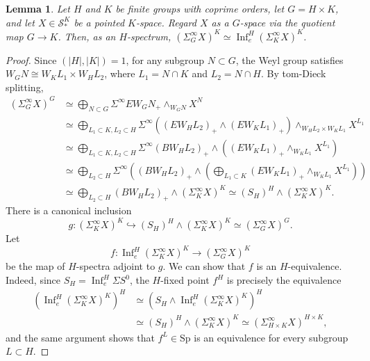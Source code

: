 \documentclass{amsart}
\theoremstyle{plain}
\newtheorem{lemma}[theorem]{Lemma}
\theoremstyle{definition}
\theoremstyle{remark}
\begin{document}
\begin{lemma}\label{lem:fixed point of suspension spectra}
    Let $H$ and $K$ be finite groups with coprime orders, let $G=H\times K$, and let $X\in \mathcal{S}^K_*$ be a pointed $K$-space. Regard $X$ as a $G$-space via the quotient map $G\to K$. Then, as an $H$-spectrum, $(\Sigma^\infty_G X)^K\simeq \operatorname{Inf}_e^H (\Sigma_K^\infty X)^K$. 
\end{lemma}
\begin{proof}
    Since $(|H|,|K|)=1$, for any subgroup $N\subset G$, the Weyl group satisfies $W_G N\cong W_K L_1\times W_H L_2$, where $L_1=N\cap K$ and $L_2=N\cap H$. By tom-Dieck splitting, 
    \[
    \begin{aligned}
        (\Sigma^\infty_{G} X)^{G} & \simeq \bigoplus_{N\subset G}\Sigma^\infty EW_GN_+\wedge_{W_G N} X^N \\
        & \simeq \bigoplus_{L_1\subset K, L_2\subset H} \Sigma^\infty ((E W_H L_2)_+\wedge (EW_K L_1)_+)\wedge_{W_H L_2\times W_K L_1} X^{L_1} \\
        & \simeq \bigoplus_{L_1\subset K, L_2\subset H} \Sigma^\infty (B W_H L_2)_+\wedge ((EW_K L_1)_+\wedge_{W_K L_1} X^{L_1}) \\
        & \simeq \bigoplus_{L_2\subset H}\Sigma^\infty ((BW_H L_2)_+\wedge (\bigoplus_{L_1\subset K} (EW_K L_1)_+\wedge_{W_K L_1} X^{L_1}))\\
        & \simeq \bigoplus_{L_2\subset H}(BW_H L_2)_+\wedge (\Sigma_K^\infty X)^K\simeq (S_H)^H\wedge (\Sigma_K^\infty X)^K.
    \end{aligned}
    \]
    There is a canonical inclusion
    \[
    g: (\Sigma^\infty_K X)^K \hookrightarrow (S_H)^H\wedge (\Sigma_K^\infty X)^K \simeq (\Sigma^\infty_G X)^G.
    \]
    Let 
    \[ 
    f:\operatorname{Inf}_e^H (\Sigma_K^\infty X)^K\to (\Sigma^\infty_G X)^K
    \]
    be the map of $H$-spectra adjoint to $g$. We can show that $f$ is an $H$-equivalence. Indeed, since $S_H=\operatorname{Inf}_e^H \Sigma S^0$, the $H$-fixed point $f^H$ is precisely the equivalence 
    \[
    \begin{aligned}
        (\operatorname{Inf}_e^H (\Sigma_K^\infty X)^K)^{H}&\simeq (S_{H}\wedge  \operatorname{Inf}_e^H (\Sigma_K^\infty X)^K)^{H} \\
        & \simeq (S_{H})^{H}\wedge (\Sigma^\infty_K X)^K \simeq (\Sigma^\infty_{H\times K} X)^{H\times K},
    \end{aligned}
    \]
    and the same argument shows that $f^L\in \mathrm{Sp}$ is an equivalence for every subgroup $L\subset H$.
\end{proof}
\end{document}
